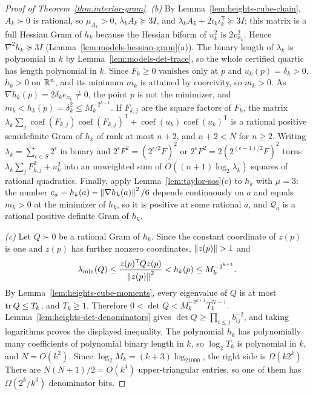 \begin{proof}[Proof of Theorem~\ref{thm:interior-gram}]
\emph{(b)} By Lemma~\ref{lem:heights-cube-chain}, $A_k\succ0$ is rational, so
$\mu_{A_k}>0$, $\lambda_kA_k\succeq3I$, and
$\lambda_kA_k+2\iota_k\iota_k^{\mathsf T}\succeq3I$; this matrix is a full Hessian Gram of
$h_k$ because the Hessian biform of $u_k^2$ is $2v_{x_k}^2$. Hence
$\nabla^2h_k\succeq3I$ (Lemma~\ref{lem:models-hessian-gram}(a)). The binary
length of $\lambda_k$ is polynomial in $k$ by
Lemma~\ref{lem:models-det-trace}, so the whole certified quartic has length
polynomial in $k$. Since $F_k\ge0$ vanishes only at $p$ and
$u_k(p)=\delta_k>0$, $h_k>0$ on $\mathbb R^n$, and its minimum $m_k$ is attained by
coercivity, so $m_k>0$. As $\nabla h_k(p)=2\delta_ke_{x_k}\ne0$, the point
$p$ is not the minimizer, and
$m_k<h_k(p)=\delta_k^2\le M_k^{-2^{k+1}}$. If $F_{k,j}$ are the square factors
of $F_k$, the matrix
$\lambda_k\sum_j\operatorname{coef}(F_{k,j})\operatorname{coef}(F_{k,j})^{\mathsf T}
+\operatorname{coef}(u_k)\operatorname{coef}(u_k)^{\mathsf T}$ is a rational
positive semidefinite Gram of $h_k$ of rank at most $n+2$, and $n+2<N$ for
$n\ge2$. Writing $\lambda_k=\sum_{\epsilon\in S}2^\epsilon$ in binary and
$2^\epsilon F^2=(2^{\epsilon/2}F)^2$ or
$2^\epsilon F^2=2(2^{(\epsilon-1)/2}F)^2$ turns
$\lambda_k\sum_jF_{k,j}^2+u_k^2$ into an unweighted sum of $O((n+1)\log_2\lambda_k)$
squares of rational quadratics. Finally, apply
Lemma~\ref{lem:taylor-sos}(c) to $h_k$ with $\mu=3$: the number
$c_a=h_k(a)-\left\lVert\nabla h_k(a)\right\rVert^2/6$ depends continuously on $a$ and equals
$m_k>0$ at the minimizer of $h_k$, so it is positive at some rational $a$, and
$\mathcal Q_a$ is a rational positive definite Gram of $h_k$.

\emph{(c)} Let $Q\succ0$ be a rational Gram of $h_k$. Since the constant
coordinate of $z(p)$ is one and $z(p)$ has further nonzero coordinates,
$\left\lVert z(p)\right\rVert>1$ and
\[
 \lambda_{\min}(Q)\le\frac{z(p)^{\mathsf T}Qz(p)}{\left\lVert z(p)\right\rVert^2}<h_k(p)
   \le M_k^{-2^{k+1}}.
\]
By Lemma~\ref{lem:heights-cube-moments}, every eigenvalue of $Q$ is at most
$\operatorname{tr} Q\le T_k$, and $T_k\ge1$. Therefore
$0<\det Q<M_k^{-2^{k+1}}T_k^{N-1}$. Lemma~\ref{lem:heights-det-denominators}
gives $\det Q\ge\prod_{i\le j}b_{ij}^{-2}$, and taking logarithms proves the
displayed inequality. The polynomial $h_k$ has polynomially many coefficients
of polynomial binary length in $k$, so $\log_2T_k$ is polynomial in $k$, and
$N=O(k^2)$. Since $\log_2M_k=(k+3)\log_21000$, the right side is
$\Omega(k2^k)$. There are $N(N+1)/2=O(k^4)$ upper-triangular entries, so one
of them has $\Omega(2^k/k^3)$ denominator bits.


\end{proof}
